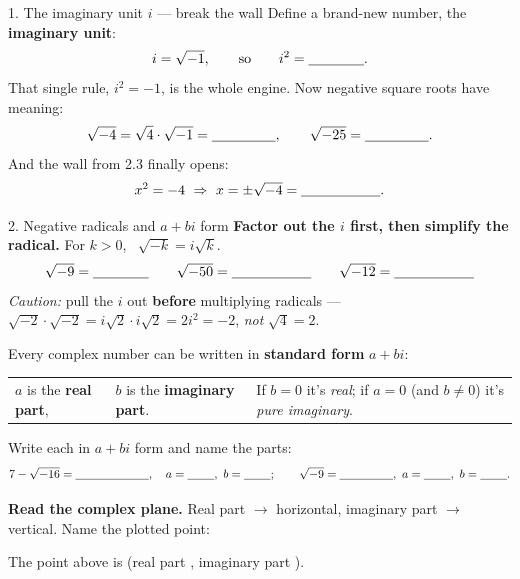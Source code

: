 \documentclass[10pt]{article}
\begin{document}
\begin{notesbox}{1. The imaginary unit $i$ --- break the wall}
Define a brand-new number, the \textbf{imaginary unit}:
\[ i=\sqrt{-1}, \qquad\text{so}\qquad i^2=\blank{1.4cm}. \]
That single rule, $i^2=-1$, is the whole engine. Now negative square roots have meaning:
\[ \sqrt{-4}=\sqrt{4}\cdot\sqrt{-1}=\blank{1.6cm}, \qquad \sqrt{-25}=\blank{1.6cm}. \]
And the wall from 2.3 finally opens:
\[ x^2=-4 \ \Rightarrow\ x=\pm\sqrt{-4}=\blank{2.0cm}. \]
\end{notesbox}

\begin{notesbox}{2. Negative radicals and $a+bi$ form}
\textbf{Factor out the $i$ first, then simplify the radical.} For $k>0$, \ $\sqrt{-k}=i\sqrt{k}$.
\[
  \sqrt{-9}=\blank{1.4cm} \qquad \sqrt{-50}=\blank{2.0cm} \qquad \sqrt{-12}=\blank{2.0cm}
\]
\emph{Caution:} pull the $i$ out \textbf{before} multiplying radicals --- $\sqrt{-2}\cdot\sqrt{-2}=i\sqrt2\cdot i\sqrt2=2i^2=-2$, \emph{not} $\sqrt{4}=2$.

\smallskip
Every complex number can be written in \textbf{standard form} $a+bi$:
\begin{center}
\renewcommand{\arraystretch}{1.3}
\begin{tabularx}{\linewidth}{@{}l l X@{}}
$a$ is the \textbf{real part}, & $b$ is the \textbf{imaginary part}. & If $b=0$ it's \emph{real}; if $a=0$ (and $b\ne0$) it's \emph{pure imaginary}. \\
\end{tabularx}
\end{center}
Write each in $a+bi$ form and name the parts:
\[ 7-\sqrt{-16}=\blank{2.2cm}, \quad a=\blank{0.8cm},\ b=\blank{0.8cm}; \qquad \sqrt{-9}=\blank{1.6cm},\ a=\blank{0.8cm},\ b=\blank{0.8cm}. \]

\textbf{Read the complex plane.} Real part $\to$ horizontal, imaginary part $\to$ vertical. Name the plotted point:
\begin{center}
\end{center}
\vspace{-4pt}
The point above is \blank{2.0cm} (real part \blank{0.8cm}, imaginary part \blank{0.8cm}).
\end{notesbox}
\end{document}
